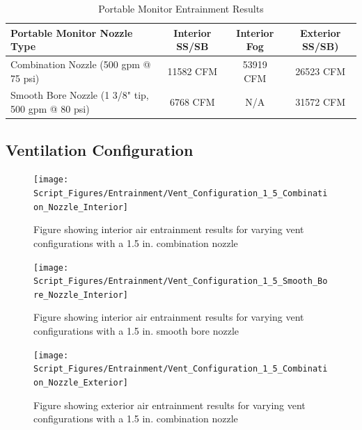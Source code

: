 \documentclass{article}
\begin{document}
\clearpage

\begin{table}[!ht]
\centering
\begin{tabular}{|l|ccc|}
\hline
\textbf{Portable Monitor Nozzle Type} & \multicolumn{1}{c|}{\textbf{Interior SS/SB}} & \multicolumn{1}{c|}{\textbf{Interior Fog}} & \textbf{Exterior SS/SB)} \\ \hline
Combination Nozzle (500 gpm @ 75 psi) & 11582 CFM & 53919 CFM & 26523 CFM \\
Smooth Bore Nozzle (1 3/8" tip, 500 gpm @ 80 psi) & 6768 CFM & N/A & 31572 CFM \\ \hline
\end{tabular}
\caption{Portable Monitor Entrainment Results}
\label{Portable_Monitor_Entrainment_Results}
\end{table}

\clearpage

\subsection{Ventilation Configuration}

\begin{figure}[!ht]
\centering
\texttt{[image: Script\_Figures/Entrainment/Vent\_Configuration\_1\_5\_Combination\_Nozzle\_Interior]}
\caption{Figure showing interior air entrainment results for varying vent configurations with a 1.5 in. combination nozzle}
\label{fig:1_5_Interior_Combination_Vent_Config}
\end{figure}

\clearpage

\begin{figure}[!ht]
\centering
\texttt{[image: Script\_Figures/Entrainment/Vent\_Configuration\_1\_5\_Smooth\_Bore\_Nozzle\_Interior]}
\caption{Figure showing interior air entrainment results for varying vent configurations with a 1.5 in. smooth bore nozzle}
\label{fig:1_5_Interior_Smooth_Bore_Vent_Config}
\end{figure}

\clearpage

\begin{figure}[!ht]
\centering
\texttt{[image: Script\_Figures/Entrainment/Vent\_Configuration\_1\_5\_Combination\_Nozzle\_Exterior]}
\caption{Figure showing exterior air entrainment results for varying vent configurations with a 1.5 in. combination nozzle}
\label{fig:1_5_Exterior_Combination_Vent_Config}
\end{figure}
\end{document}
